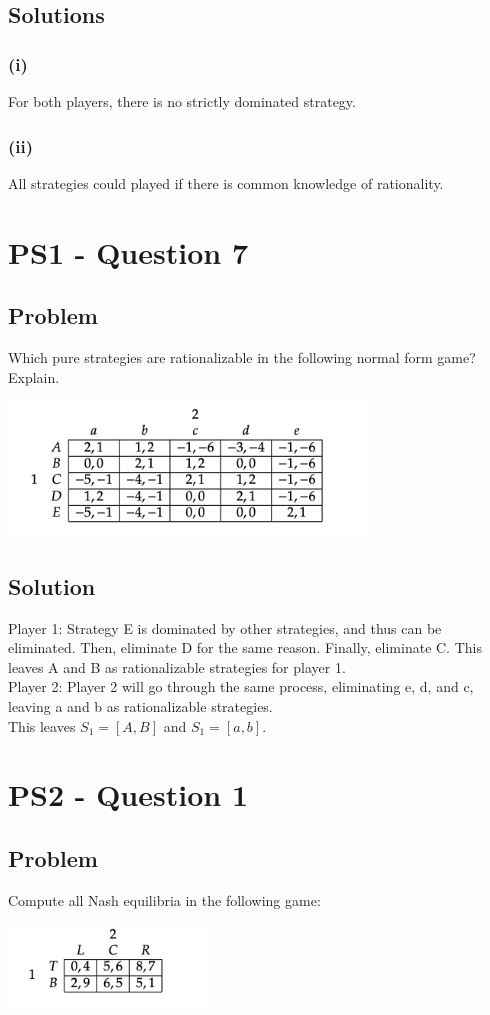 \documentclass[10pt, a4paper]{article}
\begin{document}
  \subsection*{Solutions}
    \subsubsection*{(i)}
      For both players, there is no strictly dominated strategy.
    \subsubsection*{(ii)}
      All strategies could played if there is common knowledge of rationality.
\section*{PS1 - Question 7}
  \subsection*{Problem}
    Which pure strategies are rationalizable in the following normal form game? Explain.
    \begin{center}
      \includegraphics[width = 0.72\textwidth]{PS1-7.png}
    \end{center}
  \subsection*{Solution}
    Player 1: Strategy E is dominated by other strategies, and thus can be eliminated. Then, eliminate D for the same reason. Finally, eliminate C. This leaves A and B as rationalizable strategies for player 1. \\
    Player 2: Player 2 will go through the same process, eliminating e, d, and c, leaving a and b as rationalizable strategies. \\
    This leaves $S_1 = [A,B]$ and $S_1 = [a,b]$. 
\section*{PS2 - Question 1}
  \subsection*{Problem}
    Compute all Nash equilibria in the following game:
    \begin{center}
      \includegraphics[width = 0.4\textwidth]{PS2-1.png}
    \end{center}
\end{document}
